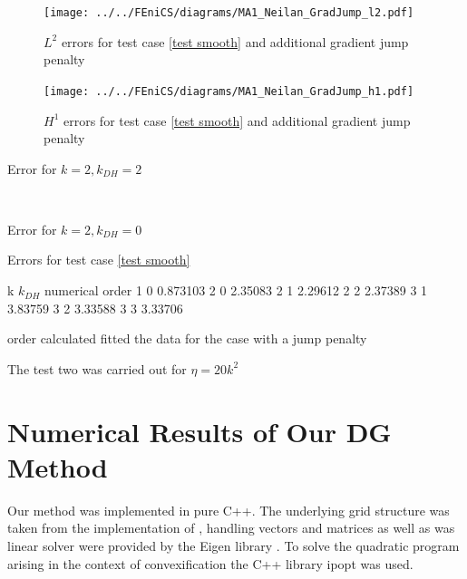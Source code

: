 \begin{figure}[h!]
\centering
	\texttt{[image: ../../FEniCS/diagrams/MA1\_Neilan\_GradJump\_l2.pdf]}
	\caption{$L^2$ errors for test case \ref{test smooth} and additional gradient jump penalty}
	\label{fig: l2 errors test 1 jump}
\end{figure}

\begin{figure}[h!]
\centering
	\texttt{[image: ../../FEniCS/diagrams/MA1\_Neilan\_GradJump\_h1.pdf]}
	\caption{$H^1$ errors for test case \ref{test smooth} and additional gradient jump penalty}
	\label{fig: h1 errors test 1 jump}
\end{figure}

\begin{table}[h]
	\begin{subtable}[b]{0.45\textwidth}
		\centering
		\pgfplotstabletypeset[
		columns={iterations, l2error, h1error,N},
		    every row 0 column 0/.style={set content=init},
		]\MAOneJumpdegTwoTwo
    	\caption{Error for $k=2, k_{DH}=2$}
   \end{subtable}
   ~
	\begin{subtable}[b]{0.45\textwidth}
		\centering
		\pgfplotstabletypeset[columns={iterations, l2error, h1error,N},
		    every row 0 column 0/.style={set content=init},
		]\MAOneJumpdegTwoZero
	\caption{Error for $k=2, k_{DH}=0$}
	\end{subtable}
	\caption{Errors for test case \ref{test smooth}}
	\label{tab: l2 errors test 1 deg 2 jump}
\end{table}


\begin{table}
	\pgfplotstabletypeset
	{
		k $k_{DH}$ {numerical order}
		1 0 0.873103
		2 0 2.35083
		2 1 2.29612
		2 2 2.37389
		3 1 3.83759
		3 2 3.33588
		3 3 3.33706
	}
\caption{order calculated fitted the data for the case with a jump penalty}
\label{tab: order jump}
\end{table}


The test two was carried out for $\eta=20k^2$


\newpage

\section{Numerical Results of Our DG Method}

Our method was implemented in pure C++. The underlying grid structure was taken from the implementation of \cite{BMV2009}, handling vectors and matrices as well as was linear solver were provided by the Eigen library \cite{eigenweb}. To solve the quadratic program arising in the context of convexification the C++ library ipopt \cite{ipopt} was used.

